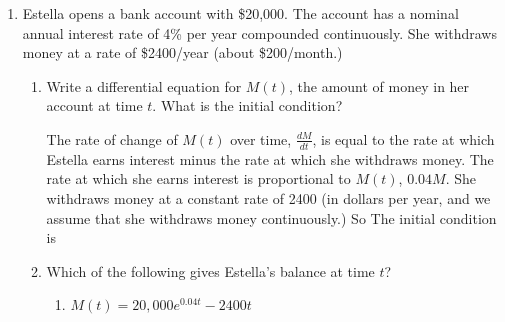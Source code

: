 \documentclass[main]{subfiles}
\begin{document}
\begin{enumerate}[resume]
\item Estella opens a bank account with \$20,000. The account has a nominal
annual interest rate of 4\% per year compounded continuously. She withdraws
money at a rate of \$2400/year (about \$200/month.) 
\begin{enumerate}
    \item 
    \begin{problem}[1in] Write a differential equation for $M(t)$,
    the amount of money in her account at time $t$. What is the initial condition?
    \end{problem}

    \begin{solution}
        The rate of change of $M(t)$ over time, $\frac{dM}{dt}$, is equal
        to the rate at which Estella earns interest minus the rate at which
        she withdraws money. The rate at which she earns interest is proportional
        to $M(t)$, $0.04M$. She withdraws money at a constant rate of 
        2400 (in dollars per year, and we assume that she withdraws money
        continuously.) So  The initial
        condition is 
    \end{solution}

    \item Which of the following gives Estella's balance at time $t$?
    \begin{enumerate}
        \item $M(t)=20,000e^{0.04t}-2400t$
    \end{enumerate}
    \pspace{\vfill}


\end{enumerate}
\end{enumerate}
\end{document}
